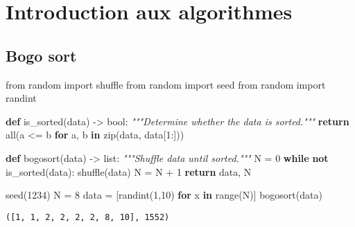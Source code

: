 \documentclass[
  letterpaper,
]{scrbook}
\newenvironment{Shaded}{}{}
\newcommand{\BuiltInTok}[1]{#1}
\newcommand{\CommentTok}[1]{\textcolor[rgb]{0.38,0.63,0.69}{\textit{#1}}}
\newcommand{\ControlFlowTok}[1]{\textcolor[rgb]{0.00,0.44,0.13}{\textbf{#1}}}
\newcommand{\DecValTok}[1]{\textcolor[rgb]{0.25,0.63,0.44}{#1}}
\newcommand{\ImportTok}[1]{#1}
\newcommand{\KeywordTok}[1]{\textcolor[rgb]{0.00,0.44,0.13}{\textbf{#1}}}
\newcommand{\NormalTok}[1]{#1}
\newcommand{\OperatorTok}[1]{\textcolor[rgb]{0.40,0.40,0.40}{#1}}
\theoremstyle{definition}
\theoremstyle{definition}
\theoremstyle{remark}
\begin{document}

\hypertarget{introduction-aux-algorithmes}{%
\chapter{Introduction aux
algorithmes}\label{introduction-aux-algorithmes}}

\hypertarget{bogo-sort}{%
\section{Bogo sort}\label{bogo-sort}}

\begin{Shaded}
\begin{Highlighting}[]
\ImportTok{from}\NormalTok{ random }\ImportTok{import}\NormalTok{ shuffle}
\ImportTok{from}\NormalTok{ random }\ImportTok{import}\NormalTok{ seed}
\ImportTok{from}\NormalTok{ random }\ImportTok{import}\NormalTok{ randint}

\KeywordTok{def}\NormalTok{ is\_sorted(data) }\OperatorTok{{-}\textgreater{}} \BuiltInTok{bool}\NormalTok{:}
    \CommentTok{"""Determine whether the data is sorted."""}
    \ControlFlowTok{return} \BuiltInTok{all}\NormalTok{(a }\OperatorTok{\textless{}=}\NormalTok{ b }\ControlFlowTok{for}\NormalTok{ a, b }\KeywordTok{in} \BuiltInTok{zip}\NormalTok{(data, data[}\DecValTok{1}\NormalTok{:]))}

\KeywordTok{def}\NormalTok{ bogosort(data) }\OperatorTok{{-}\textgreater{}} \BuiltInTok{list}\NormalTok{:}
    \CommentTok{"""Shuffle data until sorted."""}
\NormalTok{    N }\OperatorTok{=} \DecValTok{0}
    \ControlFlowTok{while} \KeywordTok{not}\NormalTok{ is\_sorted(data):}
\NormalTok{        shuffle(data)}
\NormalTok{        N }\OperatorTok{=}\NormalTok{ N }\OperatorTok{+} \DecValTok{1}
    \ControlFlowTok{return}\NormalTok{ data, N}

\NormalTok{seed(}\DecValTok{1234}\NormalTok{)}
\NormalTok{N }\OperatorTok{=} \DecValTok{8}
\NormalTok{data }\OperatorTok{=}\NormalTok{ [randint(}\DecValTok{1}\NormalTok{,}\DecValTok{10}\NormalTok{) }\ControlFlowTok{for}\NormalTok{ x }\KeywordTok{in} \BuiltInTok{range}\NormalTok{(N)]}
\NormalTok{bogosort(data)}
\end{Highlighting}
\end{Shaded}

\begin{verbatim}
([1, 1, 2, 2, 2, 2, 8, 10], 1552)
\end{verbatim}
\end{document}
